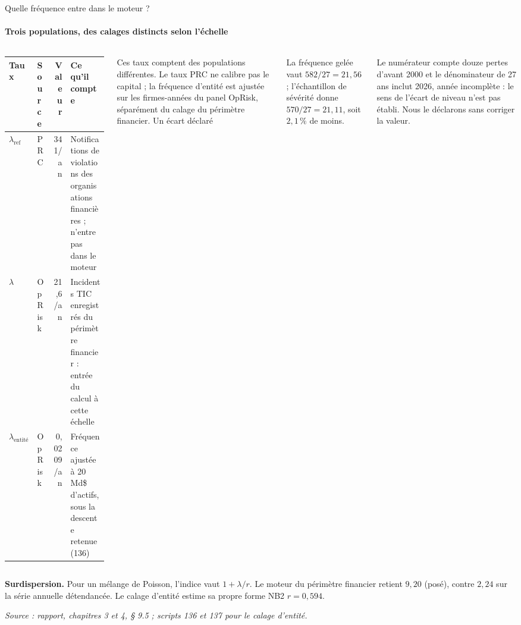\documentclass[aspectratio=169,10pt,t]{beamer}
\newcommand{\source}[1]{\par\vfill{\tiny\color{gris}\textit{Source : #1}}\par\vspace{-1mm}}
\renewcommand{\arraystretch}{1.25}
\begin{document}
\begin{frame}{Quelle fréquence entre dans le moteur ?}
  \framesubtitle{\etabli Trois populations, des calages distincts selon l'échelle}
  \begin{columns}[T,onlytextwidth]
    \footnotesize
    \renewcommand{\arraystretch}{1.1}
    \begin{tabularx}{\linewidth}{@{}>{\bfseries}l l r Y@{}}
      \toprule
      Taux & Source & Valeur & Ce qu'il compte \\
      \midrule
      $\lambda_{\mathrm{ref}}$ & PRC & 341/an & Notifications de violations des organisations financières ; n'entre pas dans le moteur \\
      $\lambda$ & OpRisk & 21,6/an & Incidents TIC enregistrés du périmètre financier : entrée du calcul à cette échelle \\
      $\lambda_{\mathrm{entité}}$ & OpRisk & 0,0209/an & Fréquence ajustée à 20 Md\$ d'actifs, sous la descente retenue (136) \\
      \bottomrule
    \end{tabularx}\par\vspace{2mm}
    Ces taux comptent des populations différentes. Le taux PRC ne calibre pas le capital ; la fréquence d'entité est ajustée sur les firmes-années du panel OpRisk, séparément du calage du périmètre financier.
    \footnotesize
    {\editorial\normalsize Un écart déclaré}\par\vspace{1.5mm}
    La fréquence gelée vaut $582/27 = 21{,}56$ ; l'échantillon de sévérité donne $570/27 = 21{,}11$, soit $2{,}1\,\%$ de moins.\par\vspace{1.5mm}
    Le numérateur compte douze pertes d'avant 2000 et le dénominateur de 27 ans inclut 2026, année incomplète : le sens de l'écart de niveau n'est pas établi. Nous le déclarons sans corriger la valeur.
  \end{columns}
  \vspace{1mm}
  \footnotesize\textbf{Surdispersion.} Pour un mélange de Poisson, l'indice vaut $1+\lambda/r$. Le moteur du périmètre financier retient $9{,}20$ (posé), contre $2{,}24$ sur la série annuelle détendancée. Le calage d'entité estime sa propre forme NB2 $r=0{,}594$.
  \source{rapport, chapitres 3 et 4, § 9.5 ; scripts 136 et 137 pour le calage d'entité.}
\end{frame}
\end{document}
